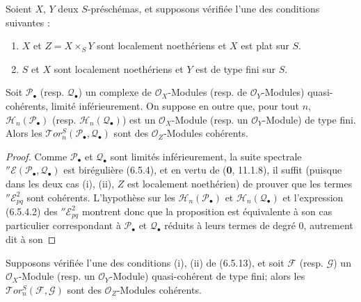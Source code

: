 \begin{proposition}[6.5.13]
Soient $X$, $Y$ deux $S$-préschémas, et supposons vérifiée l'une des conditions
suivantes :
\begin{enumerate}
  \item[\textup{(i)}] $X$ et $Z=X\times_S Y$ sont localement noethériens et $X$ est plat
    sur $S$.
  \item[\textup{(ii)}] $S$ et $X$ sont localement noethériens et $Y$ est de type fini
    sur $S$.
\end{enumerate}
Soit $\mathscr P_\bullet$ \textup{(resp.} $\mathscr Q_\bullet$) un complexe de
$\mathscr O_X$-Modules \textup{(resp.} de $\mathscr O_Y$-Modules) quasi-cohérents,
limité inférieurement. On suppose en outre que, pour tout $n$,
$\mathscr H_n(\mathscr P_\bullet)$ \textup{(resp.}
$\mathscr H_n(\mathscr Q_\bullet)$) est un $\mathscr O_X$-Module \textup{(resp.} un
$\mathscr O_Y$-Module) de type fini. Alors les
$\mathscr{T}\!or_n^S(\mathscr P_\bullet,\mathscr Q_\bullet)$ sont des
$\mathscr O_Z$-Modules cohérents.
\end{proposition}

\begin{proof}
Comme $\mathscr P_\bullet$ et $\mathscr Q_\bullet$ sont limités
inférieurement, la suite spectrale
$''\mathscr E(\mathscr P_\bullet,\mathscr Q_\bullet)$ est birégulière (6.5.4),
et en vertu de (\textbf{0}, 11.1.8), il suffit (puisque dans les deux cas (i), (ii), $Z$
est localement noethérien) de prouver que les termes
$''\mathscr E_{pq}^2$ sont cohérents. L'hypothèse sur les
$\mathscr H_n(\mathscr P_\bullet)$ et
$\mathscr H_n(\mathscr Q_\bullet)$ et l'expression (6.5.4.2) des
$''\mathscr E_{pq}^2$ montrent donc que la proposition est équivalente à son
cas particulier correspondant à $\mathscr P_\bullet$ et
$\mathscr Q_\bullet$ réduits à leurs termes de degré 0, autrement dit à son
\end{proof}

\begin{corollary}[6.5.14]
Supposons vérifiée l'une des conditions \textup{(i), (ii)} de \textup{(6.5.13)}, et soit
$\mathscr F$ \textup{(resp.} $\mathscr G$) un $\mathscr O_X$-Module \textup{(resp.} un
$\mathscr O_Y$-Module) quasi-cohérent de type fini; alors les
$\mathscr{T}\!or_n^S(\mathscr F,\mathscr G)$ sont des $\mathscr O_Z$-Modules
cohérents.
\end{corollary}

